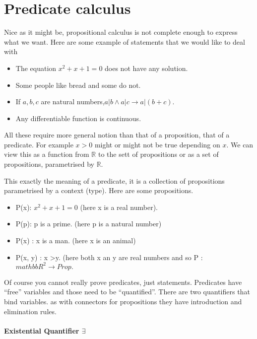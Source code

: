 \section{Predicate calculus}\label{sec:predicatecalculus}

Nice as it might be, propositional calculus is not complete enough to express what we want. Here are some example of statements that we would like to deal with
\begin{itemize}
\item The equation $x^2+x+1=0$ does not have any solution.
\item Some people like bread and some do not.
\item If $a,b, c$ are natural numbers,$a|b \land a | c \rightarrow a | (b+c)$.
\item Any differentiable function is continuous.
\end{itemize}

All these require more general notion than that of a proposition, that of a predicate. 
For example $x>0$ might or might not be true depending on $x$. We can view this as a function from $\mathbb{R}$ to the sett of propositions or as a set of propositions, parametrised by $\mathbb{R}$. 

This exactly the meaning of a predicate, it is a collection of propositions parametrised by a context (type). Here are some propositions.

\begin{itemize}
\item P(x): $x^{2}+x+1 =0$ (here x is a real number).
\item P(p): p is a prime. (here p is a natural number)
\item P(x) : x is a man. (here x is an animal)
\item P(x, y) : x >y. (here both x an y are real numbers and so P : $mathbb{R}^{2}\rightarrow Prop.$

\end{itemize}	

Of course you cannot really prove predicates, just statements. Predicates have ``free'' variables and those need to be ``quantified''. There are two quantifiers that bind variables. as with connectors for propositions they have introduction and elimination rules.

\paragraph{\bf Existential Quantifier $\exists$}

